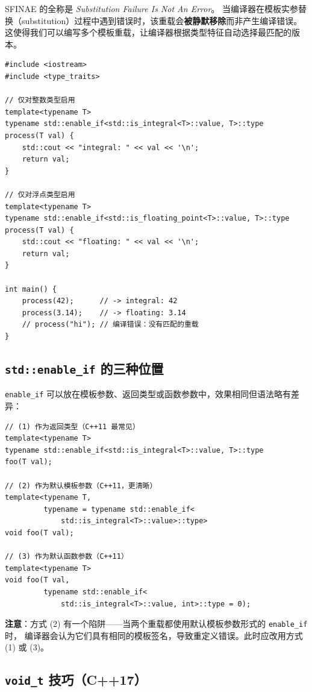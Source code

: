 \documentclass[12pt,a4paper,fontset=fandol]{ctexbook}
\begin{document}
SFINAE 的全称是 \emph{Substitution Failure Is Not An Error}。
当编译器在模板实参替换（substitution）过程中遇到错误时，该重载会\textbf{被静默移除}而非产生编译错误。
这使得我们可以编写多个模板重载，让编译器根据类型特征自动选择最匹配的版本。

\begin{lstlisting}
#include <iostream>
#include <type_traits>

// 仅对整数类型启用
template<typename T>
typename std::enable_if<std::is_integral<T>::value, T>::type
process(T val) {
    std::cout << "integral: " << val << '\n';
    return val;
}

// 仅对浮点类型启用
template<typename T>
typename std::enable_if<std::is_floating_point<T>::value, T>::type
process(T val) {
    std::cout << "floating: " << val << '\n';
    return val;
}

int main() {
    process(42);      // -> integral: 42
    process(3.14);    // -> floating: 3.14
    // process("hi"); // 编译错误：没有匹配的重载
}
\end{lstlisting}

\subsection{\texttt{std::enable\_if} 的三种位置}

\texttt{enable\_if} 可以放在模板参数、返回类型或函数参数中，效果相同但语法略有差异：

\begin{lstlisting}
// (1) 作为返回类型（C++11 最常见）
template<typename T>
typename std::enable_if<std::is_integral<T>::value, T>::type
foo(T val);

// (2) 作为默认模板参数（C++11，更清晰）
template<typename T,
         typename = typename std::enable_if<
             std::is_integral<T>::value>::type>
void foo(T val);

// (3) 作为默认函数参数（C++11）
template<typename T>
void foo(T val,
         typename std::enable_if<
             std::is_integral<T>::value, int>::type = 0);
\end{lstlisting}

\textbf{注意}：方式 (2) 有一个陷阱——当两个重载都使用默认模板参数形式的 \texttt{enable\_if} 时，
编译器会认为它们具有相同的模板签名，导致重定义错误。此时应改用方式 (1) 或 (3)。

\subsection{\texttt{void\_t} 技巧（C++17）}
\end{document}
